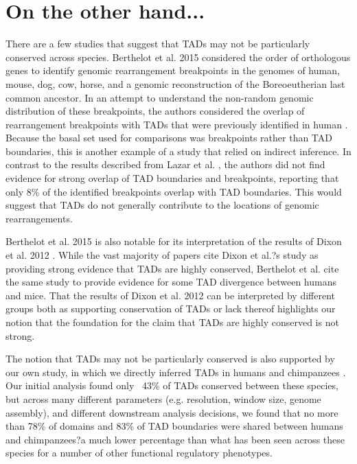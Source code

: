 \section{On the other hand...}
There are a few studies that suggest that TADs may not be particularly conserved across species. Berthelot et al. 2015 \cite{Berthelot.2015} considered the order of orthologous genes to identify genomic rearrangement breakpoints in the genomes of human, mouse, dog, cow, horse, and a genomic reconstruction of the Boreoeutherian last common ancestor. In an attempt to understand the non-random genomic distribution of these breakpoints, the authors considered the overlap of rearrangement breakpoints with TADs that were previously identified in human \cite{Dixon.2012}. Because the basal set used for comparisons was breakpoints rather than TAD boundaries, this is another example of a study that relied on indirect inference. In contrast to the results described from Lazar et al. \cite{Lazar.2018}, the authors did not find evidence for strong overlap of TAD boundaries and breakpoints, reporting that only 8\% of the identified breakpoints overlap with TAD boundaries. This would suggest that TADs do not generally contribute to the locations of genomic rearrangements.

Berthelot et al. 2015 \cite{Berthelot.2015} is also notable for its interpretation of the results of Dixon et al. 2012 \cite{Dixon.2012}. While the vast majority of papers cite Dixon et al.?s study as providing strong evidence that TADs are highly conserved, Berthelot et al. cite the same study to provide evidence for some TAD divergence between humans and mice. That the results of Dixon et al. 2012 can be interpreted by different groups both as supporting conservation of TADs or lack thereof highlights our notion that the foundation for the claim that TADs are highly conserved is not strong.

The notion that TADs may not be particularly conserved is also supported by our own study, in which we directly inferred TADs in humans and chimpanzees \cite{Eres.2019}. Our initial analysis found only ~43\% of TADs conserved between these species, but across many different parameters (e.g. resolution, window size, genome assembly), and different downstream analysis decisions, we found that no more than 78\% of domains and 83\% of TAD boundaries were shared between humans and chimpanzees?a much lower percentage than what has been seen across these species for a number of other functional regulatory phenotypes.

